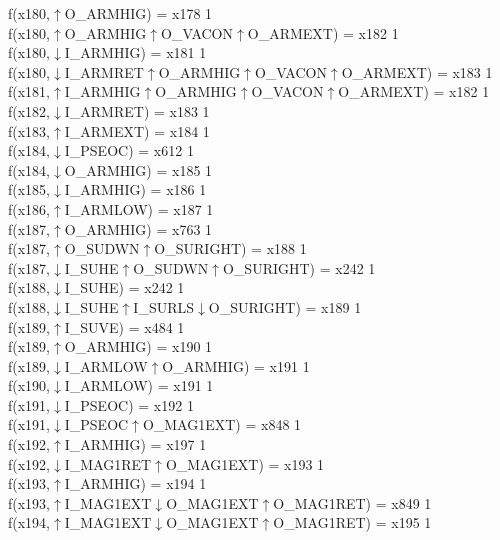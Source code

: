 f(x180,$\uparrow$O\_ARMHIG) = x178 {1} \\
f(x180,$\uparrow$O\_ARMHIG$\uparrow$O\_VACON$\uparrow$O\_ARMEXT) = x182 {1} \\
f(x180,$\downarrow$I\_ARMHIG) = x181 {1} \\
f(x180,$\downarrow$I\_ARMRET$\uparrow$O\_ARMHIG$\uparrow$O\_VACON$\uparrow$O\_ARMEXT) = x183 {1} \\
f(x181,$\uparrow$I\_ARMHIG$\uparrow$O\_ARMHIG$\uparrow$O\_VACON$\uparrow$O\_ARMEXT) = x182 {1} \\
f(x182,$\downarrow$I\_ARMRET) = x183 {1} \\
f(x183,$\uparrow$I\_ARMEXT) = x184 {1} \\
f(x184,$\downarrow$I\_PSEOC) = x612 {1} \\
f(x184,$\downarrow$O\_ARMHIG) = x185 {1} \\
f(x185,$\downarrow$I\_ARMHIG) = x186 {1} \\
f(x186,$\uparrow$I\_ARMLOW) = x187 {1} \\
f(x187,$\uparrow$O\_ARMHIG) = x763 {1} \\
f(x187,$\uparrow$O\_SUDWN$\uparrow$O\_SURIGHT) = x188 {1} \\
f(x187,$\downarrow$I\_SUHE$\uparrow$O\_SUDWN$\uparrow$O\_SURIGHT) = x242 {1} \\
f(x188,$\downarrow$I\_SUHE) = x242 {1} \\
f(x188,$\downarrow$I\_SUHE$\uparrow$I\_SURLS$\downarrow$O\_SURIGHT) = x189 {1} \\
f(x189,$\uparrow$I\_SUVE) = x484 {1} \\
f(x189,$\uparrow$O\_ARMHIG) = x190 {1} \\
f(x189,$\downarrow$I\_ARMLOW$\uparrow$O\_ARMHIG) = x191 {1} \\
f(x190,$\downarrow$I\_ARMLOW) = x191 {1} \\
f(x191,$\downarrow$I\_PSEOC) = x192 {1} \\
f(x191,$\downarrow$I\_PSEOC$\uparrow$O\_MAG1EXT) = x848 {1} \\
f(x192,$\uparrow$I\_ARMHIG) = x197 {1} \\
f(x192,$\downarrow$I\_MAG1RET$\uparrow$O\_MAG1EXT) = x193 {1} \\
f(x193,$\uparrow$I\_ARMHIG) = x194 {1} \\
f(x193,$\uparrow$I\_MAG1EXT$\downarrow$O\_MAG1EXT$\uparrow$O\_MAG1RET) = x849 {1} \\
f(x194,$\uparrow$I\_MAG1EXT$\downarrow$O\_MAG1EXT$\uparrow$O\_MAG1RET) = x195 {1} \\
